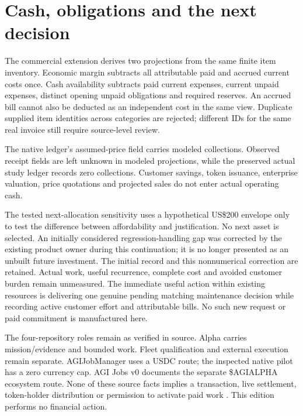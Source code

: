\documentclass[11pt,letterpaper]{article}
\newcommand{\usd}[1]{US\$#1}
\begin{document}
\section{Cash, obligations and the next decision}
The commercial extension derives two projections from the same finite item inventory. Economic margin subtracts all attributable paid and accrued current costs once. Cash availability subtracts paid current expenses, current unpaid expenses, distinct opening unpaid obligations and required reserves. An accrued bill cannot also be deducted as an independent cost in the same view. Duplicate supplied item identities across categories are rejected; different IDs for the same real invoice still require source-level review.

The native ledger's assumed-price field carries modeled collections. Observed receipt fields are left unknown in modeled projections, while the preserved actual study ledger records zero collections. Customer savings, token issuance, enterprise valuation, price quotations and projected sales do not enter actual operating cash.

The tested next-allocation sensitivity uses a hypothetical \usd{200} envelope only to test the difference between affordability and justification. No next asset is selected. An initially considered regression-handling gap was corrected by the existing product owner during this continuation; it is no longer presented as an unbuilt future investment. The initial record and this nonnumerical correction are retained. Actual work, useful recurrence, complete cost and avoided customer burden remain unmeasured. The immediate useful action within existing resources is delivering one genuine pending matching maintenance decision while recording active customer effort and attributable bills. No such new request or paid commitment is manufactured here.

The four-repository roles remain as verified in source. Alpha carries mission/evidence and bounded work. Fleet qualification and external execution remain separate. AGIJobManager uses a USDC route; the inspected native pilot has a zero currency cap. AGI Jobs v0 documents the separate \$AGIALPHA ecosystem route. None of these source facts implies a transaction, live settlement, token-holder distribution or permission to activate paid work \cite{manager,jobs,fleet}. This edition performs no financial action.
\end{document}
